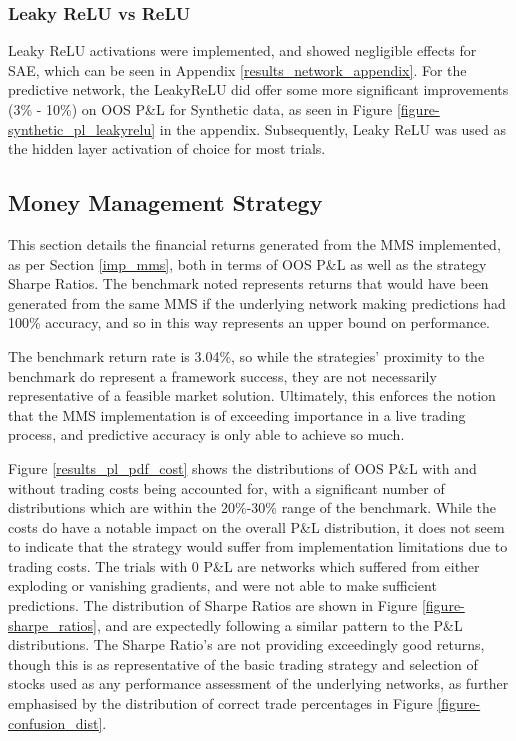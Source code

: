\documentclass[a4paper,11pt,oneside]{article}
\theoremstyle{plain}
\theoremstyle{definition}
\begin{document}
	\subsubsection{Leaky ReLU vs ReLU}
	
	Leaky ReLU activations were implemented, and showed negligible effects for SAE, which can be seen in Appendix \ref{results_network_appendix}. For the predictive network, the LeakyReLU did offer some more significant improvements (3\% - 10\%) on OOS P\&L for Synthetic data, as seen in Figure \ref{figure-synthetic_pl_leakyrelu} in the appendix. Subsequently, Leaky ReLU was used as the hidden layer activation of choice for most trials.
	
	\newpage
	\subsection{Money Management Strategy}\label{results_mms}
	
	This section details the financial returns generated from the MMS implemented, as per Section \ref{imp_mms}, both in terms of OOS P\&L as well as the strategy Sharpe Ratios. The benchmark noted represents returns that would have been generated from the same MMS if the underlying network making predictions had 100\% accuracy, and so in this way represents an upper bound on performance.\newline
	
	The benchmark return rate is 3.04\%, so while the strategies' proximity to the benchmark do represent a framework success, they are not necessarily representative of a feasible market solution. Ultimately, this enforces the notion that the MMS implementation is of exceeding importance in a live trading process, and predictive accuracy is only able to achieve so much. \newline
	
	Figure \ref{results_pl_pdf_cost} shows the distributions of OOS P\&L with and without trading costs being accounted for, with a significant number of distributions which are within the 20\%-30\% range of the benchmark. While the costs do have a notable impact on the overall P\&L distribution, it does not seem to indicate that the strategy would suffer from implementation limitations due to trading costs. The trials with 0 P\&L are networks which suffered from either exploding or vanishing gradients, and were not able to make sufficient predictions. The distribution of Sharpe Ratios are shown in Figure \ref{figure-sharpe_ratios}, and are expectedly following a similar pattern to the P\&L distributions. The Sharpe Ratio's are not providing exceedingly good returns, though this is as representative of the basic trading strategy and selection of stocks used as any performance assessment of the underlying networks, as further emphasised by the distribution of correct trade percentages in Figure \ref{figure-confusion_dist}. \newline 
	
\end{document}
